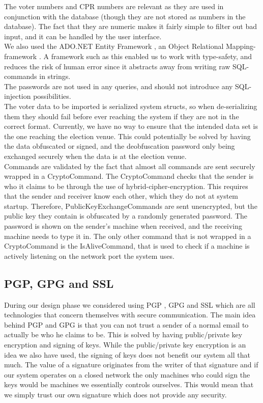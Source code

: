 \documentclass[a4paper]{report}
\begin{document}
The voter numbers and CPR numbers are relevant as they are used in conjunction with the database (though they are not stored as numbers in the database). The fact that they are numeric makes it fairly simple to filter out bad input, and it can be handled by the user interface. \\

We also used the ADO.NET Entity Framework \cite{adonet}, an Object Relational Mapping-framework \cite{orm}. A framework such as this enabled us to work with type-safety, and reduces the risk of human error since it abstracts away from writing raw SQL-commands in strings. \\

The passwords are not used in any queries, and should not introduce any SQL-injection possibilities.\\

The voter data to be imported is serialized system structs, so when de-serializing them they should fail before ever reaching the system if they are not in the correct format. Currently, we have no way to ensure that the intended data set is the one reaching the election venue. This could potentially be solved by having the data obfuscated or signed, and the deobfuscation password only being exchanged securely when the data is at the election venue. \\

Commands are validated by the fact that almost all commands are sent securely wrapped in a CryptoCommand. The CryptoCommand checks that the sender is who it claims to be through the use of hybrid-cipher-encryption. This requires that the sender and receiver know each other, which they do not at system startup. Therefore, PublicKeyExchangeCommands are sent unencrypted, but the public key they contain is obfuscated by a randomly generated password. The password is shown on the sender's machine when received, and the receiving machine needs to type it in. The only other command that is not wrapped in a CryptoCommand is the IsAliveCommand, that is used to check if a machine is actively listening on the network port the system uses.

\subsection{PGP, GPG and SSL}
During our design phase we considered using PGP \cite{pgp}, GPG \cite{gpg} and SSL \cite{ssl} which are all technologies that concern themselves with secure communication. The main idea behind PGP and GPG is that you can not trust a sender of a normal email to actually be who he claims to be. This is solved by having public/private key encryption and signing of keys. While the public/private key encryption is an idea we also have used, the signing of keys does not benefit our system all that much. The value of a signature originates from the writer of that signature and if our system operates on a closed network the only machines who could sign the keys would be machines we essentially controls ourselves. This would mean that we simply trust our own signature which does not provide any security. \\
\end{document}
